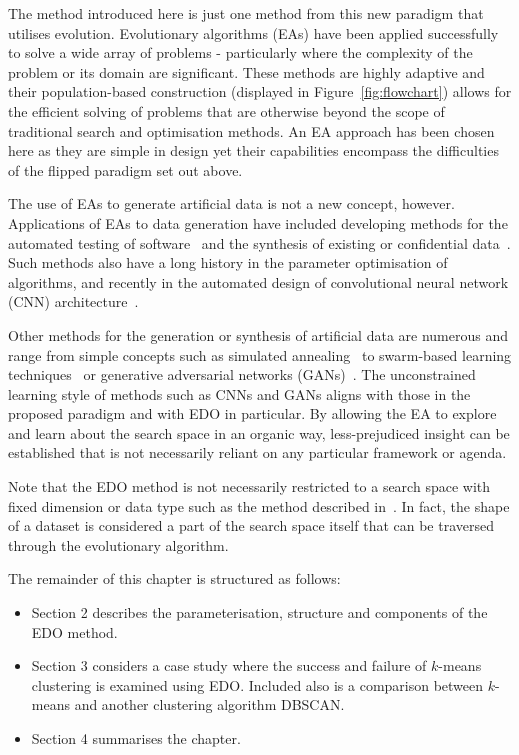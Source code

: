 
The method introduced here is just one method from this new paradigm that
utilises evolution. Evolutionary algorithms (EAs) have been applied successfully
to solve a wide array of problems \-- particularly where the complexity of the
problem or its domain are significant. These methods are highly adaptive and
their population-based construction (displayed in Figure~\ref{fig:flowchart})
allows for the efficient solving of problems that are otherwise beyond the scope
of traditional search and optimisation methods. An EA approach has been chosen
here as they are simple in design yet their capabilities encompass the
difficulties of the flipped paradigm set out above.


The use of EAs to generate artificial data is not a new concept, however.
Applications of EAs to data generation have included developing methods for the
automated testing of software~\cite{Koleejan2015,Michael2001,Sharifipour2018}
and the synthesis of existing or confidential data~\cite{Chen2016}. Such methods
also have a long history in the parameter optimisation of algorithms, and
recently in the automated design of convolutional neural network (CNN)
architecture~\cite{Suganuma2017,Sun2018}.

Other methods for the generation or synthesis of artificial data are numerous
and range from simple concepts such as simulated annealing~\cite{Matejka2017}
to swarm-based learning techniques~\cite{Abualigah2018b} or generative
adversarial networks (GANs)~\cite{Goodfellow2014}. The unconstrained learning
style of methods such as CNNs and GANs aligns with those in the proposed
paradigm and with EDO in particular. By allowing the EA to explore and learn
about the search space in an organic way, less-prejudiced insight can be
established that is not necessarily reliant on any particular framework or
agenda.

Note that the EDO method is not necessarily restricted to a search space with
fixed dimension or data type such as the method described in~\cite{Chen2016}. In
fact, the shape of a dataset is considered a part of the search space itself
that can be traversed through the evolutionary algorithm.

The remainder of this chapter is structured as follows:
\begin{itemize}
    \item Section 2 describes the parameterisation, structure and components of
        the EDO method.
    \item Section 3 considers a case study where the success and failure of
        \(k\)-means clustering is examined using EDO. Included also is a
        comparison between \(k\)-means and another clustering algorithm DBSCAN.\
    \item Section 4 summarises the chapter.
\end{itemize}

